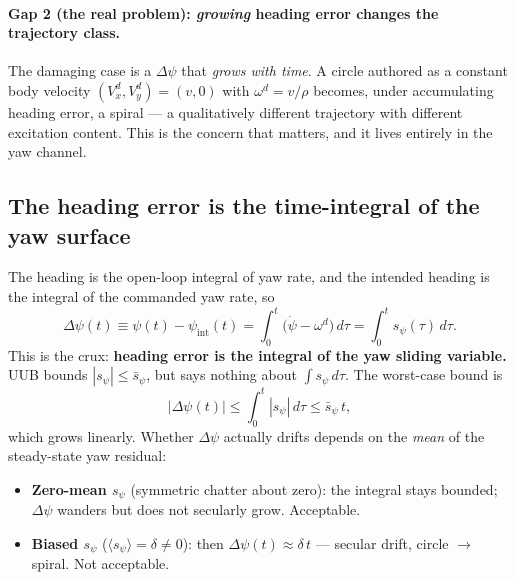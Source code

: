 \documentclass[11pt]{article}
\theoremstyle{plain}
\theoremstyle{definition}
\newcommand{\Vx}{V_x}
\newcommand{\Vy}{V_y}
\begin{document}
\paragraph{Gap 2 (the real problem): \emph{growing} heading error changes the
trajectory class.} The damaging case is a $\Delta\psi$ that \emph{grows with time}. A
circle authored as a constant body velocity $(\Vx^d,\Vy^d)=(v,0)$ with
$\omega^d=v/\rho$ becomes, under accumulating heading error, a spiral --- a
qualitatively different trajectory with different excitation content. This is the
concern that matters, and it lives entirely in the yaw channel.

\subsection{The heading error is the time-integral of the yaw surface}
The heading is the open-loop integral of yaw rate, and the intended heading is the
integral of the commanded yaw rate, so
\begin{equation}
\Delta\psi(t)\equiv\psi(t)-\psi_{\mathrm{int}}(t)
=\int_0^t\big(\dot\psi-\omega^d\big)\,d\tau=\int_0^t s_\psi(\tau)\,d\tau.
\label{eq:dpsi_integral}
\end{equation}
This is the crux: \textbf{heading error is the integral of the yaw sliding variable.}
UUB bounds $|s_\psi|\le\bar s_\psi$, but says nothing about
$\int s_\psi\,d\tau$. The worst-case bound is
\begin{equation}
|\Delta\psi(t)|\le\int_0^t|s_\psi|\,d\tau\le\bar s_\psi\,t,
\label{eq:dpsi_linear}
\end{equation}
which grows linearly. Whether $\Delta\psi$ actually drifts depends on the
\emph{mean} of the steady-state yaw residual:
\begin{itemize}[leftmargin=1.5em]
\item \textbf{Zero-mean $s_\psi$} (symmetric chatter about zero): the integral stays
bounded; $\Delta\psi$ wanders but does not secularly grow. Acceptable.
\item \textbf{Biased $s_\psi$} ($\langle s_\psi\rangle=\delta\neq0$): then
$\Delta\psi(t)\approx\delta\,t$ --- secular drift, circle $\to$ spiral. Not acceptable.
\end{itemize}
\end{document}
